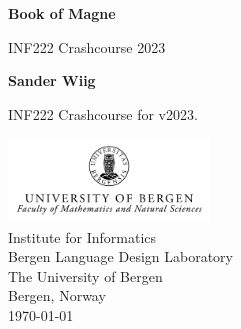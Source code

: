 
\begin{titlepage}
    \begin{center}
        \vspace*{1cm}

        \huge
        \textbf{Book of Magne}

        \vspace{0.5cm}
        \LARGE
        INF222 Crashcourse 2023
            
        \vspace{1.5cm}

        \textbf{Sander Wiig}

        \vfill
        
        \Large
        INF222 Crashcourse for v2023.\\
            
        \vspace{0.5cm}
    
        \includegraphics[width=0.4\textwidth]{assets/UiBlogoMN_gray_m_Eng.png}\\
        \Large
        Institute for Informatics\\
        Bergen Language Design Laboratory\\
        The University of Bergen\\
        Bergen, Norway\\
        \today
            
    \end{center}
\end{titlepage}